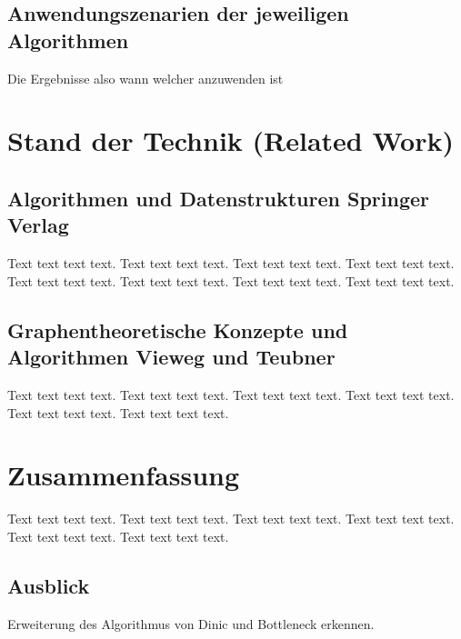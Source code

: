 \documentclass[a4paper]{llncs}
\begin{document}
\subsection{Anwendungszenarien der jeweiligen Algorithmen}
Die Ergebnisse also wann welcher anzuwenden ist

\section{Stand der Technik (Related Work)}
\label{Related Work}
\subsection{Algorithmen und Datenstrukturen Springer Verlag}
Text text text text. Text text text text. Text text text text. Text text text text. Text text text text. Text text text text. Text text text text. Text text text text. 
\subsection{Graphentheoretische Konzepte und Algorithmen Vieweg und Teubner}
Text text text text. Text text text text. Text text text text. Text text text text. Text text text text. Text text text text. 
\section{Zusammenfassung}
\label{Zusammenfassung}
Text text text text. Text text text text. Text text text text. Text text text text. Text text text text. Text text text text. 

\subsection{Ausblick}
Erweiterung des Algorithmus von Dinic und Bottleneck erkennen.


 
\end{document}
